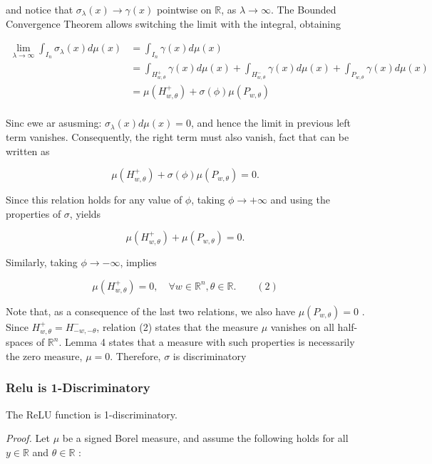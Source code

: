 and notice that $\sigma_\lambda(x) \rightarrow \gamma(x)$ pointwise on $\mathbb{R}$, as $\lambda \rightarrow \infty$. The Bounded Convergence Theorem allows switching the limit with the integral, obtaining

\[
    \begin{split}
        \lim _{\lambda \rightarrow \infty} \int_{I_n} \sigma_{\lambda}(x) d \mu(x) &=\int_{I_n} \gamma(x) d \mu(x) \\
&=\int_{H_{w, \theta}^{+}} \gamma(x) d \mu(x)+\int_{H_{w, \theta}^{-}} \gamma(x) d \mu(x)+\int_{P_{w, \theta}} \gamma(x)d\mu(x) \\
&=\mu\left(H_{w, \theta}^{+}\right)+\sigma(\phi) \mu\left(P_{w, \theta}\right)\\ 
    \end{split}
\]

Sinc ewe ar asusming: $\sigma_\lambda(x) d \mu(x)=0$, and hence the limit in previous left term vanishes. Consequently, the right term must also vanish, fact that can be written as

$$
\mu\left(H_{w, \theta}^{+}\right)+\sigma(\phi) \mu\left(P_{w, \theta}\right)=0.
$$

Since this relation holds for any value of $\phi$, taking $\phi \rightarrow+\infty$ and using the  properties of $\sigma$, yields

$$
\mu\left(H_{w, \theta}^{+}\right)+\mu\left(P_{w, \theta}\right)=0 .
$$

Similarly, taking $\phi \rightarrow-\infty$, implies

$$
\mu\left(H_{w, \theta}^{+}\right)=0, \quad \forall w \in \mathbb{R}^n, \theta \in \mathbb{R}. \qquad (2)
$$

Note that, as a consequence of the last two relations, we also have $\mu(P_{w,\theta})=0$ . Since $H_{w, \theta}^{+}=H_{-w,-\theta}^{-}$, relation (2) states that the measure $\mu$ vanishes on all half-spaces of $\mathbb{R}^n$. Lemma 4 states that a measure with such properties is necessarily the zero measure, $\mu=0$. Therefore, $\sigma$ is discriminatory

\subsubsection{Relu is 1-Discriminatory} The ReLU function is 1-discriminatory.

\textit{Proof.} Let $\mu$ be a signed Borel measure, and assume the following holds for all $y \in \mathbb{R}$ and $\theta \in \mathbb{R}$ :


